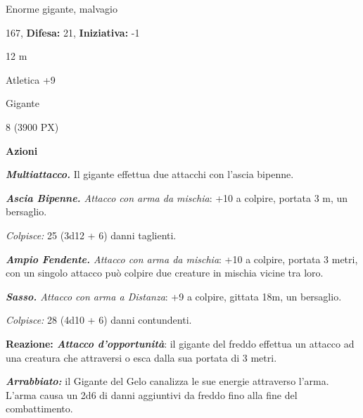 \begin{multicols}{2}
{
\noindent
\begin{description}[noitemsep, topsep=0pt, parsep=0pt, partopsep=0pt, leftmargin=0cm, labelwidth=2.2cm]
	\item[\textbf{Taglia/Tipo:}] Enorme gigante, malvagio
	\item[\textbf{Caratt.:}] 
	\item[\textbf{Punti Ferita:}] 167,  \textbf{Difesa:} 21,  \textbf{Iniziativa:} -1
	\item[\textbf{Movimento:}] 12 m
	\item[\textbf{Tiri Salvez.:}] 
	\item[\textbf{Comp.:}] Atletica +9
	\item[\textbf{Linguaggi:}] Gigante
	\item[\textbf{Sfida:}] 8 (3900 PX)\smallskip
\end{description}

\textbf{Azioni}

\emph{\textbf{Multiattacco.}} Il gigante effettua due attacchi con l'ascia bipenne.

\emph{\textbf{Ascia Bipenne.} Attacco con arma da mischia}: +10 a colpire, portata 3 m, un bersaglio.

\emph{Colpisce:} 25 (3d12 + 6) danni taglienti.

\emph{\textbf{Ampio Fendente.} Attacco con arma da mischia}: +10 a colpire, portata 3 metri, con un singolo attacco può colpire due creature in mischia vicine tra loro.

\emph{\textbf{Sasso.} Attacco con arma a Distanza}: +9 a colpire, gittata 18m, un bersaglio.

\emph{Colpisce:} 28 (4d10 + 6) danni contundenti.

\textbf{Reazione: \emph{Attacco d'opportunità}}: il gigante del freddo effettua un attacco ad una creatura che attraversi o esca dalla sua portata di 3 metri.

\emph{\textbf{Arrabbiato:}} il Gigante del Gelo canalizza le sue energie attraverso l'arma. L'arma causa un 2d6 di danni aggiuntivi da freddo fino alla fine del combattimento.

}
\end{multicols}
